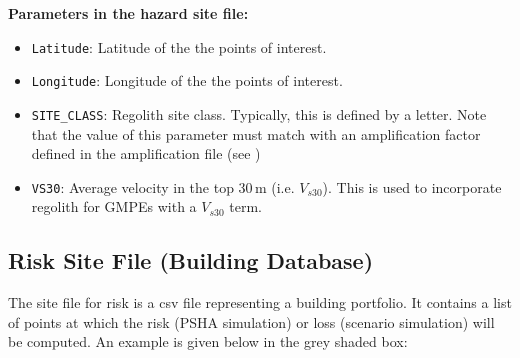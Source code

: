 \textbf{Parameters in the hazard site file:}
\begin{itemize}
\item \texttt{Latitude}: Latitude of the the points of interest.
\item \texttt{Longitude}: Longitude of the the points of interest.
\item \texttt{SITE\_CLASS}: Regolith site class. Typically, this is defined
by a letter. Note that the value of this parameter must match with
an amplification factor defined in the amplification file (see
)
\item \texttt{VS30}: Average velocity in the top 30\,m (i.e. $V_{s30}$). This is used
to incorporate regolith for GMPEs with a $V_{s30}$ term.
\end{itemize}

\subsection{Risk Site File (Building Database)}
\label{sec:grids-bdatabase}

The site file for risk is a csv file representing a building
portfolio. It contains a list of points at which the risk (PSHA simulation)
 or loss (scenario simulation) will be computed. An example is
 given below in the grey shaded box:



